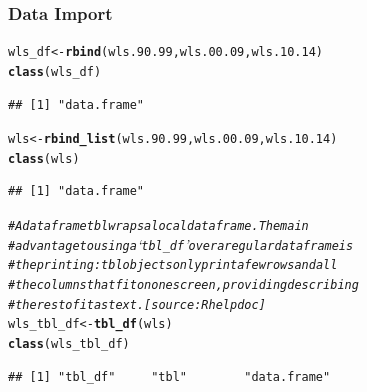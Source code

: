 \documentclass{beamer}\usepackage[]{graphicx}\usepackage[]{color}
\makeatletter
\newcommand{\hlcom}[1]{\textcolor[rgb]{0.678,0.584,0.686}{\textit{#1}}}%
\newcommand{\hlstd}[1]{\textcolor[rgb]{0.345,0.345,0.345}{#1}}%
\newcommand{\hlkwb}[1]{\textcolor[rgb]{0.69,0.353,0.396}{#1}}%
\newcommand{\hlkwd}[1]{\textcolor[rgb]{0.737,0.353,0.396}{\textbf{#1}}}%
\newenvironment{kframe}{%
 \def\at@end@of@kframe{}%
 \ifinner\ifhmode%
  \def\at@end@of@kframe{\end{minipage}}%
  \begin{minipage}{\columnwidth}%
 \fi\fi%
 \def\FrameCommand##1{\hskip\@totalleftmargin \hskip-\fboxsep
 \colorbox{shadecolor}{##1}\hskip-\fboxsep
     \hskip-\linewidth \hskip-\@totalleftmargin \hskip\columnwidth}%
 \MakeFramed {\advance\hsize-\width
   \@totalleftmargin\z@ \linewidth\hsize
   \@setminipage}}%
 {\par\unskip\endMakeFramed%
 \at@end@of@kframe}
\newenvironment{knitrout}{}{} %
\makeatother
\begin{document}
\begin{frame}[fragile]
  \frametitle{Data Import}
\begin{knitrout}\footnotesize
{}\color{fgcolor}\begin{kframe}
\begin{alltt}
\hlstd{wls_df} \hlkwb{<-} \hlkwd{rbind}\hlstd{(wls.90.99, wls.00.09, wls.10.14)}
\hlkwd{class}\hlstd{(wls_df)}
\end{alltt}
\begin{verbatim}
## [1] "data.frame"
\end{verbatim}
\begin{alltt}
\hlstd{wls} \hlkwb{<-} \hlkwd{rbind_list}\hlstd{(wls.90.99, wls.00.09, wls.10.14)}
\hlkwd{class}\hlstd{(wls)}
\end{alltt}
\begin{verbatim}
## [1] "data.frame"
\end{verbatim}
\begin{alltt}
\hlcom{# A data frame tbl wraps a local data frame. The main}
\hlcom{# advantage to using a ‘tbl_df’ over a regular data frame is}
\hlcom{# the printing: tbl objects only print a few rows and all}
\hlcom{# the columns that fit on one screen, providing describing}
\hlcom{# the rest of it as text. [source: R help doc]}
\hlstd{wls_tbl_df} \hlkwb{<-} \hlkwd{tbl_df}\hlstd{(wls)}
\hlkwd{class}\hlstd{(wls_tbl_df)}
\end{alltt}
\begin{verbatim}
## [1] "tbl_df"     "tbl"        "data.frame"
\end{verbatim}
\end{kframe}
\end{knitrout}
\end{frame} 
\end{document}
